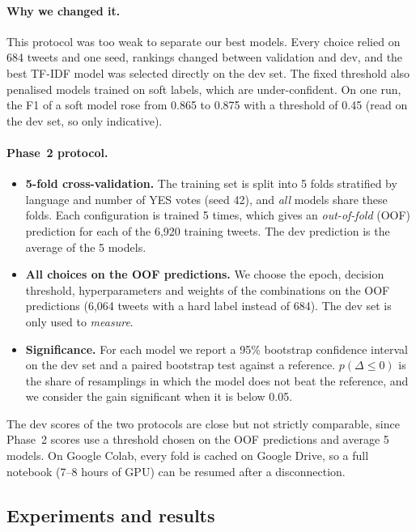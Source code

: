 \documentclass[pdflatex,sn-mathphys-num]{sn-jnl}
\begin{document}
\paragraph{Why we changed it.} This protocol was too weak to separate our best models. Every choice relied on 684 tweets and one seed, rankings changed between validation and dev, and the best TF-IDF model was selected directly on the dev set. The fixed threshold also penalised models trained on soft labels, which are under-confident. On one run, the F1 of a soft model rose from 0.865 to 0.875 with a threshold of 0.45 (read on the dev set, so only indicative).

\paragraph{Phase~2 protocol.}
\begin{itemize}
\item \textbf{5-fold cross-validation.} The training set is split into 5 folds stratified by language and number of YES votes (seed 42), and \emph{all} models share these folds. Each configuration is trained 5 times, which gives an \emph{out-of-fold} (OOF) prediction for each of the 6,920 training tweets. The dev prediction is the average of the 5 models.
\item \textbf{All choices on the OOF predictions.} We choose the epoch, decision threshold, hyperparameters and weights of the combinations on the OOF predictions (6,064 tweets with a hard label instead of 684). The dev set is only used to \emph{measure}.
\item \textbf{Significance.} For each model we report a 95\% bootstrap confidence interval on the dev set and a paired bootstrap test against a reference. $p(\Delta \le 0)$ is the share of resamplings in which the model does not beat the reference, and we consider the gain significant when it is below 0.05.
\end{itemize}
The dev scores of the two protocols are close but not strictly comparable, since Phase~2 scores use a threshold chosen on the OOF predictions and average 5 models. On Google Colab, every fold is cached on Google Drive, so a full notebook (7--8 hours of GPU) can be resumed after a disconnection.

\subsection{Experiments and results}\label{sec:results}
\end{document}
